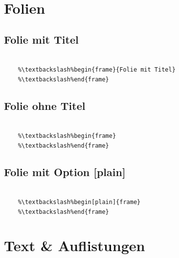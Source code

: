 \section{Folien}

\subsection{Folie mit Titel}
\begin{frame}[fragile]{\subsecname}

  \begin{lstlisting}[gobble=4,escapechar=\%]
    %\%% Folie mit Titel

    %\textbackslash%begin{frame}{Folie mit Titel}
    %\textbackslash%end{frame}
  \end{lstlisting}

\end{frame}

\subsection{Folie ohne Titel}
\begin{frame}[fragile]

  \begin{lstlisting}[gobble=4,escapechar=\%]
    %\%% Folie ohne Titel
    
    %\textbackslash%begin{frame}
    %\textbackslash%end{frame}
  \end{lstlisting}
  
\end{frame}

\subsection{Folie mit Option [plain]}
\begin{frame}

  \begin{lstlisting}[gobble=4,escapechar=\%]
    %\%% Folie mit Option [plain]

    %\textbackslash%begin[plain]{frame}
    %\textbackslash%end{frame}
  \end{lstlisting}

\end{frame}

\section{Text \& Auflistungen}

